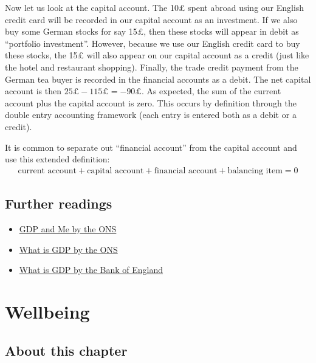 \documentclass[
]{book}
\providecommand{\tightlist}{%
  \setlength{\itemsep}{0pt}\setlength{\parskip}{0pt}}
\begin{document}
Now let us look at the capital account. The 10£ spent abroad using our English credit card will be recorded in our capital account as an investment. If we also buy some German stocks for say 15£, then these stocks will appear in debit as ``portfolio investment''. However, because we use our English credit card to buy these stocks, the 15£ will also appear on our capital account as a credit (just like the hotel and restaurant shopping). Finally, the trade credit payment from the German tea buyer is recorded in the financial accounts as a debit. The net capital account is then \(25£-115£=-90£\). As expected, the sum of the current account plus the capital account is zero. This occurs by definition through the double entry accounting framework (each entry is entered both as a debit or a credit).

It is common to separate out ``financial account'' from the capital account and use this extended definition:
\begin{align}
  \text{current account}+\text{capital account}+\text{financial account}+\text{balancing item}=0
\end{align}

\hypertarget{further-readings-2}{%
\section{Further readings}\label{further-readings-2}}

\begin{itemize}
\tightlist
\item
  \href{https://www.ons.gov.uk/economy/grossdomesticproductgdp/articles/gdpandme/2017-03-20}{GDP and Me by the ONS}
\item
  \href{https://www.ons.gov.uk/economy/grossdomesticproductgdp/articles/whatisgdp/2016-11-21}{What is GDP by the ONS}
\item
  \href{https://www.bankofengland.co.uk/knowledgebank/what-is-gdp}{What is GDP by the Bank of England}
\end{itemize}

\hypertarget{wellbeing}{%
\chapter{Wellbeing}\label{wellbeing}}

\hypertarget{about-this-chapter}{%
\section{About this chapter}\label{about-this-chapter}}
\end{document}

